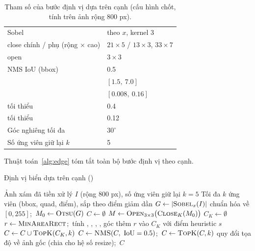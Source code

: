 \begin{table}[htbp]
\centering
\caption{Tham số của bước định vị dựa trên cạnh (cấu hình chốt, tính trên ảnh rộng 800 px).}
\label{tab:edgeparams}
\small
{}
\begin{tabularx}{\textwidth}{lY}
\hline
{}  &  \\
\hline
Sobel & theo $x$, kernel 3 \\
close chính / phụ (rộng $\times$ cao) & $21\times 5$ / $13\times 3$, $33\times 7$ \\
open & $3\times 3$ \\
NMS IoU (bbox) & 0.5 \\
 & $[1.5,\ 7.0]$ \\
 & $[0.008,\ 0.16]$ \\
 tối thiểu & 0.4 \\
 tối thiểu & 0.12 \\
Góc nghiêng tối đa & $30^\circ$ \\
Số ứng viên giữ lại $k$ & 5 \\
\hline
\end{tabularx}
\end{table}

Thuật toán~\ref{alg:edge} tóm tắt toàn bộ bước định vị theo cạnh.

\begin{algorithm}[htbp]
\caption{Định vị biển dựa trên cạnh ()}
\label{alg:edge}
\begin{algorithmic}[1]
\Require Ảnh xám đã tiền xử lý $I$ (rộng 800 px), số ứng viên giữ lại $k=5$
\Ensure Tối đa $k$ ứng viên (bbox, quad, điểm), sắp theo điểm giảm dần
\State $G \gets |\textsc{Sobel}_x(I)|$ chuẩn hóa về $[0,255]$;\ $M_0 \gets \textsc{Otsu}(G)$
\State $C \gets \emptyset$
    \State $M \gets \textsc{Open}_{3\times 3}\big(\textsc{Close}_K(M_0)\big)$
    \State $C_K \gets \emptyset$
        \State $r \gets \textsc{MinAreaRect}$;\ tính , , , , góc
            \State thêm $r$ vào $C_K$ với điểm heuristic $s$
        \EndIf
    \EndFor
    \State $C \gets C \cup \textsc{TopK}(C_K, k)$
\EndFor
\State $C \gets \textsc{NMS}(C,\ \text{IoU}=0.5)$;\ $C \gets \textsc{TopK}(C, k)$
\State quy đổi tọa độ về ảnh gốc (chia cho hệ số resize);\ \Return $C$
\end{algorithmic}
\end{algorithm}

